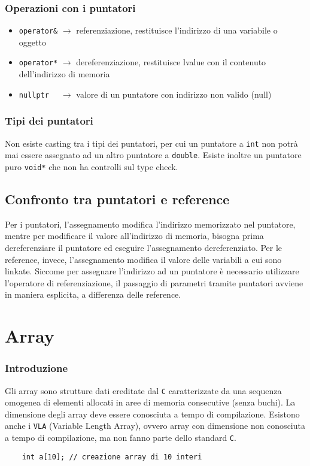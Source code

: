 \documentclass[a4paper]{article}
\begin{document}
\subsubsection*{Operazioni con i puntatori}
\begin{itemize}
	\item \verb|operator&| \(\rightarrow\) referenziazione, restituisce l'indirizzo di una variabile o oggetto
	\item \verb|operator*| \(\rightarrow\) dereferenziazione, restituisce lvalue con il contenuto dell'indirizzo di memoria
	\item \verb|nullptr  | \(\rightarrow\) valore di un puntatore con indirizzo non valido (null)
\end{itemize}

\subsubsection*{Tipi dei puntatori}
Non esiste casting tra i tipi dei puntatori, per cui un puntatore a \verb|int| non potrà mai essere assegnato ad un altro
puntatore a \verb|double|. Esiste inoltre un puntatore puro \verb|void*| che non ha controlli sul type check.

\subsection{Confronto tra puntatori e reference}
Per i puntatori, l'assegnamento modifica l'indirizzo memorizzato nel puntatore, mentre per modificare il valore all'indirizzo
di memoria, bisogna prima dereferenziare il puntatore ed eseguire l'assegnamento dereferenziato. Per le reference, invece,
l'assegnamento modifica il valore delle variabili a cui sono linkate.
Siccome per assegnare l'indirizzo ad un puntatore è necessario utilizzare l'operatore di referenziazione, il passaggio di
parametri tramite puntatori avviene in maniera esplicita, a differenza delle reference.

\newpage

\section{Array}
\subsubsection*{Introduzione}
Gli array sono strutture dati ereditate dal \verb|C| caratterizzate da una sequenza omogenea di elementi allocati in aree di
memoria consecutive (senza buchi). La dimensione degli array deve essere conosciuta a tempo di compilazione. Esistono anche
i \verb|VLA| (Variable Length Array), ovvero array con dimensione non conosciuta a tempo di compilazione, ma non fanno parte
dello standard \verb|C|.
\begin{lstlisting}
	int a[10]; // creazione array di 10 interi
\end{lstlisting}
\end{document}
